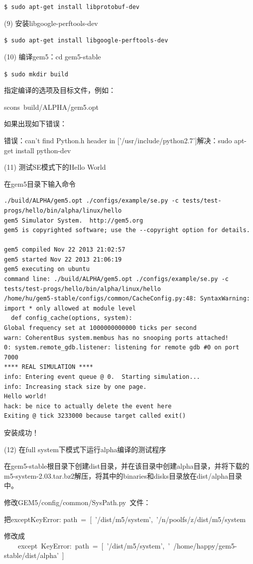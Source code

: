 \verb"$ sudo apt-get install libprotobuf-dev"

(9)	安装libgoogle-perftools-dev

\verb"$ sudo apt-get install libgoogle-perftools-dev"

(10)	编译gem5：cd gem5-stable

\verb"$ sudo mkdir build"

指定编译的选项及目标文件，例如：

scons build/ALPHA/gem5.opt

如果出现如下错误：

错误：can't find Python.h header in ['/usr/include/python2.7']解决：sudo apt-get install python-dev

(11) 测试SE模式下的Hello World

在gem5目录下输入命令
\begin{verbatim}
./build/ALPHA/gem5.opt ./configs/example/se.py -c tests/test-progs/hello/bin/alpha/linux/hello 
gem5 Simulator System.  http://gem5.org
gem5 is copyrighted software; use the --copyright option for details.

gem5 compiled Nov 22 2013 21:02:57
gem5 started Nov 22 2013 21:06:19
gem5 executing on ubuntu
command line: ./build/ALPHA/gem5.opt ./configs/example/se.py -c tests/test-progs/hello/bin/alpha/linux/hello
/home/hu/gem5-stable/configs/common/CacheConfig.py:48: SyntaxWarning: import * only allowed at module level
  def config_cache(options, system):
Global frequency set at 1000000000000 ticks per second
warn: CoherentBus system.membus has no snooping ports attached!
0: system.remote_gdb.listener: listening for remote gdb #0 on port 7000
**** REAL SIMULATION ****
info: Entering event queue @ 0.  Starting simulation...
info: Increasing stack size by one page.
Hello world!
hack: be nice to actually delete the event here
Exiting @ tick 3233000 because target called exit()
\end{verbatim}
安装成功！

(12) 在full system下模式下运行alpha编译的测试程序

在gem5-stable根目录下创建dist目录，并在该目录中创建alpha目录，并将下载的m5-system-2.03.tar.bz2解压，将其中的binaries和disks目录放在dist/alpha目录中。

修改GEM5/config/common/SysPath.py 文件：

把exceptKeyError: path = [ '/dist/m5/system', '/n/poolfs/z/dist/m5/system  

修改成  
　　except KeyError: path = [ '/dist/m5/system', ' /home/happy/gem5-stable/dist/alpha' ]

